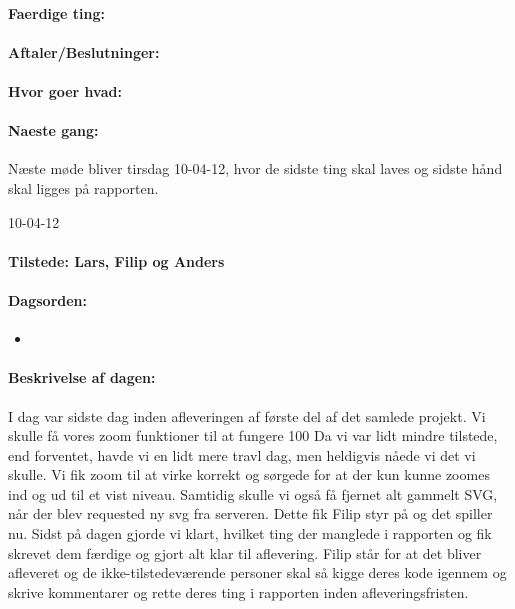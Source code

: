 \documentclass[a4paper,10pt,titlepage]{article}
\begin{document}
		\paragraph{Faerdige ting:}
		
		\paragraph{Aftaler/Beslutninger:}
		
		\paragraph{Hvor goer hvad:}
		
		\paragraph{Naeste gang:}
		Næste møde bliver tirsdag 10-04-12, hvor de sidste ting skal laves og sidste hånd skal ligges på rapporten. \mbox{}\\ 
		
		\begin{center}
		10-04-12
		\end{center}
		
		\paragraph{Tilstede: Lars, Filip og Anders}
		\paragraph{Dagsorden:}
		\begin{itemize}
					\item 
					 
		\end{itemize}
		
		\paragraph{Beskrivelse af dagen:}
		I dag var sidste dag inden afleveringen af første del af det samlede projekt. Vi skulle få vores zoom funktioner til at fungere 100%
Da vi var lidt mindre tilstede, end forventet, havde vi en lidt mere travl dag, men heldigvis nåede vi det vi skulle. Vi fik zoom til at virke korrekt og sørgede for at der kun kunne zoomes ind og ud til et vist niveau. Samtidig skulle vi også få fjernet alt gammelt SVG, når der blev requested ny svg fra serveren. Dette fik Filip styr på og det spiller nu. Sidst på dagen gjorde vi klart, hvilket ting der manglede i rapporten og fik skrevet dem færdige og gjort alt klar til aflevering. Filip står for at det bliver afleveret og de ikke-tilstedeværende personer skal så kigge deres kode igennem og skrive kommentarer og rette deres ting i rapporten inden afleveringsfristen.
\end{document}
